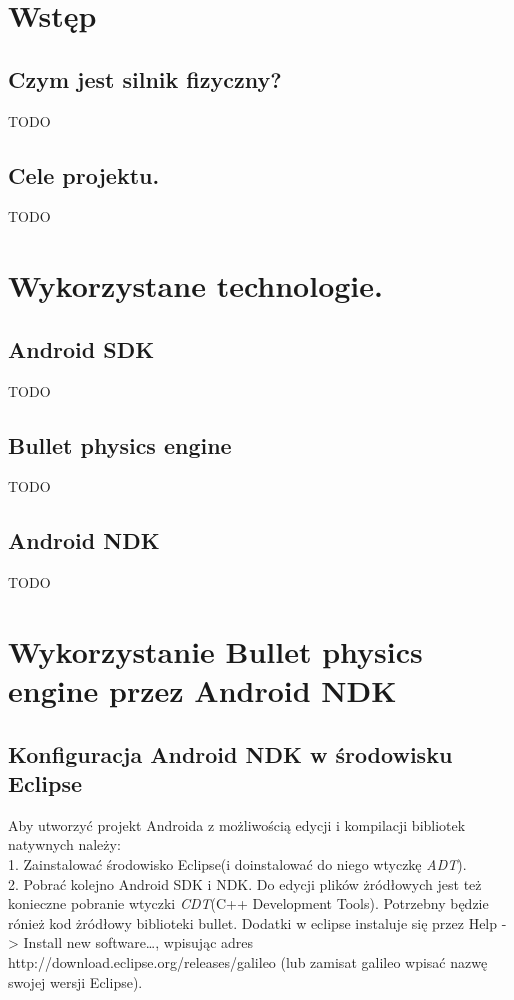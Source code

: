   \section{Wstęp}\label{sec:wstep}
  \subsection{Czym jest silnik fizyczny?}\label{subsec:czymJestSilnik}
TODO
  \subsection{Cele projektu.}\label{subsec:celeProjektu}
TODO
  \section{Wykorzystane technologie.}
  \subsection{Android SDK}
TODO
  \subsection{Bullet physics engine}
TODO
  \subsection{Android NDK}
TODO
  \section{Wykorzystanie Bullet physics engine przez Android NDK}
  \subsection{Konfiguracja Android NDK w środowisku Eclipse}
  Aby utworzyć projekt Androida z możliwością edycji i kompilacji bibliotek
  natywnych należy: \\
  1. Zainstalować środowisko Eclipse(i doinstalować do niego wtyczkę
  \emph{ADT}).\\
  2. Pobrać kolejno Android SDK i NDK. Do edycji plików żródłowych jest
  też konieczne pobranie wtyczki \emph{CDT}(C++ Development Tools). Potrzebny
  będzie rónież kod żródłowy biblioteki bullet. Dodatki w eclipse instaluje się przez
  Help -> Install new software\ldots , wpisując adres http://download.eclipse.org/releases/galileo (lub zamisat
  galileo wpisać nazwę swojej wersji Eclipse).
  
